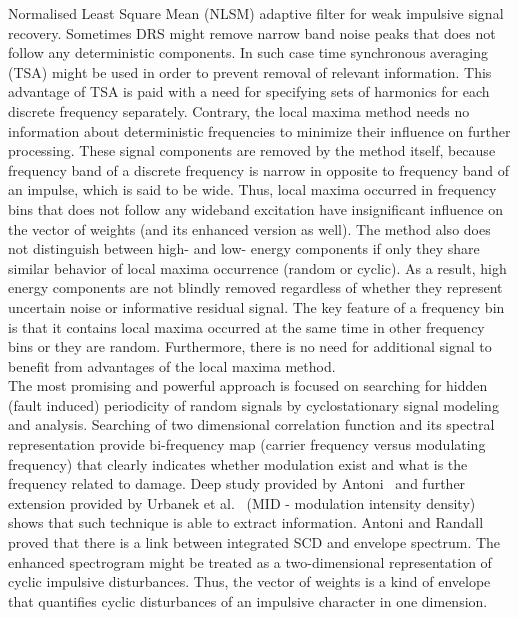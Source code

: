 \documentclass[3p,times]{elsarticle}
\begin{document}
Normalised Least Square Mean (NLSM) adaptive filter for weak impulsive signal recovery. Sometimes DRS might remove narrow band noise peaks that does not follow any deterministic components. In such case time synchronous averaging (TSA) might be used in order to prevent removal of relevant information. This advantage of TSA is paid with a need for specifying sets of harmonics for each discrete frequency separately. Contrary, the local maxima method needs no information about deterministic frequencies to minimize their influence on further processing. These signal components are removed by the method itself, because frequency band of a discrete frequency is narrow in opposite to frequency band of an impulse, which is said to be wide. Thus, local maxima occurred in frequency bins that does not follow any wideband excitation have insignificant influence on the vector of weights (and its enhanced version as well). The method also does not distinguish between high- and low- energy components if only they share similar behavior of local maxima occurrence (random or cyclic). As a result, high energy components are not blindly removed regardless of whether they represent uncertain noise or informative residual signal. The key feature of a frequency bin is that it contains local maxima occurred at the same time in other frequency bins or they are random. Furthermore, there is no need for additional signal to benefit from advantages of the local maxima method.\\
The most promising and powerful approach is focused on searching for hidden (fault induced) periodicity of random signals by cyclostationary signal modeling and analysis. Searching of two dimensional correlation function and its spectral representation provide bi-frequency map (carrier frequency versus modulating frequency) that clearly indicates whether  modulation exist and what is the frequency related to damage. Deep study provided by Antoni~\cite{CYCLAntoni} and further extension provided by Urbanek et al.~\cite{MID} (MID - modulation intensity density) shows that such technique is able to extract information. Antoni and Randall proved that there is a link between integrated SCD and envelope spectrum. The enhanced spectrogram might be treated as a two-dimensional representation of cyclic impulsive disturbances. Thus, the vector of weights is a kind of envelope that quantifies cyclic disturbances of an impulsive character in one dimension.\\
\end{document}
